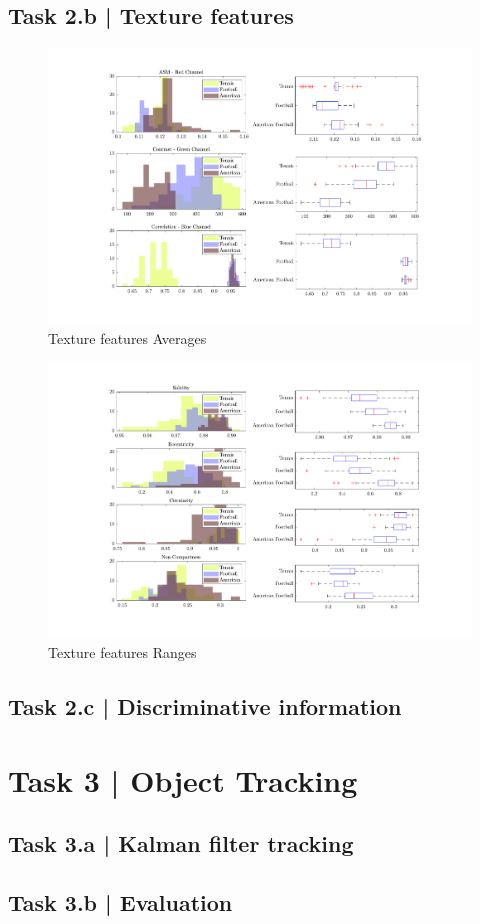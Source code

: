 \documentclass[conference]{IEEEtran}
\begin{document}
\subsection*{Task 2.b | Texture features}

\begin{figure}[htbp]
    \centering
    \includegraphics[width=\columnwidth]{figures/averages.pdf}
    \caption{Texture features Averages}
    \label{fig:tex_feats_avgs}
\end{figure}

\begin{figure}[htbp]
    \centering
    \includegraphics[width=\columnwidth]{figures/shape_feats.pdf}
    \caption{Texture features Ranges}
    \label{fig:tex_feats_ranges}
\end{figure}


\subsection*{Task 2.c | Discriminative information}

\section*{Task 3 | Object Tracking}

\subsection*{Task 3.a | Kalman filter tracking}

\subsection*{Task 3.b | Evaluation}
\end{document}
